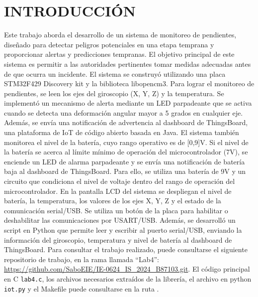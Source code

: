 \newpage
\section{INTRODUCCIÓN}
 Este trabajo aborda el desarrollo de un sistema de monitoreo de pendientes, diseñado para detectar peligros potenciales en una etapa temprana y proporcionar alertas y predicciones tempranas. El objetivo principal de este sistema es permitir a las autoridades pertinentes tomar medidas adecuadas antes de que ocurra un incidente. El sistema se construyó utilizando una placa STM32F429 Discovery kit y la biblioteca libopencm3. Para lograr el monitoreo de pendientes, se leen los ejes del giroscopio (X, Y, Z) y la temperatura. Se implementó un mecanismo de alerta mediante un LED parpadeante que se activa cuando se detecta una deformación angular mayor a 5 grados en cualquier eje. Además, se envía una notificación de advertencia al dashboard de ThingsBoard, una plataforma de IoT de código abierto basada en Java. El sistema también monitorea el nivel de la batería, cuyo rango operativo es de [0,9]V. Si el nivel de la batería se acerca al límite mínimo de operación del microcontrolador (7V), se enciende un LED de alarma parpadeante y se envía una notificación de batería baja al dashboard de ThingsBoard. Para ello, se utiliza una batería de 9V y un circuito que condiciona el nivel de voltaje dentro del rango de operación del microcontrolador. En la pantalla LCD del sistema se despliegan el nivel de batería, la temperatura, los valores de los ejes X, Y, Z y el estado de la comunicación serial/USB. Se utiliza un botón de la placa para habilitar o deshabilitar las comunicaciones por USART/USB. Además, se desarrolló un script en Python que permite leer y escribir al puerto serial/USB, enviando la información del giroscopio, temperatura y nivel de batería al dashboard de ThingsBoard.
 Para consultar el trabajo realizado, puede consultarse el siguiente repositorio de trabajo, en la rama llamada ``Lab4'': \url{https://github.com/SaboEIE/IE-0624_IS_2024_B87103.git}. El código principal en C \texttt{lab4.c}, los archivos necesarios extraídos de la librería, el archivo en python \texttt{iot.py} y el Makefile puede consultarse en la ruta . 
 